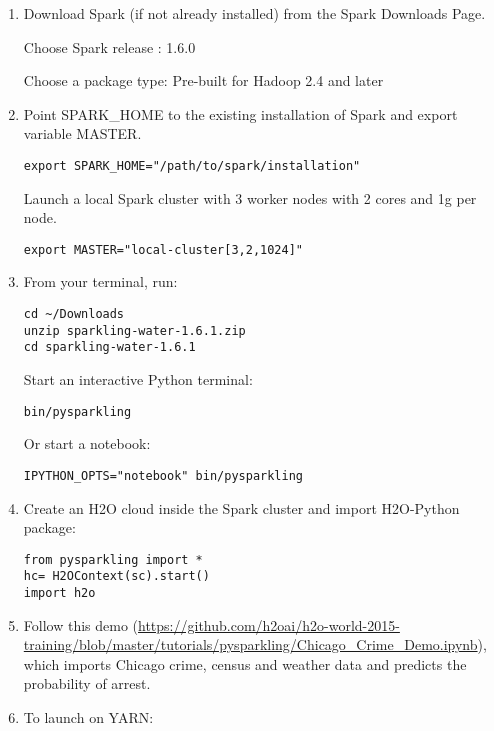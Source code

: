 \begin{enumerate}
\item Download Spark (if not already installed) from the Spark Downloads Page.

Choose Spark release : 1.6.0

Choose a package type: Pre-built for Hadoop 2.4 and later

\item Point SPARK\_HOME to the existing installation of Spark and export variable MASTER.

\begin{lstlisting}[style=Bash]
export SPARK_HOME="/path/to/spark/installation" 
\end{lstlisting}

Launch a local Spark cluster with 3 worker nodes with 2 cores and 1g per node.
\begin{lstlisting}[style=Bash]
export MASTER="local-cluster[3,2,1024]" 
\end{lstlisting}

\item From your terminal, run:

\begin{lstlisting}[style=Bash]
cd ~/Downloads
unzip sparkling-water-1.6.1.zip
cd sparkling-water-1.6.1
\end{lstlisting}

Start an interactive Python terminal:
\begin{lstlisting}[style=Bash]
bin/pysparkling
\end{lstlisting}

Or start a notebook:
\begin{lstlisting}[style=Bash]
IPYTHON_OPTS="notebook" bin/pysparkling
\end{lstlisting}

\item Create an H2O cloud inside the Spark cluster and import H2O-Python package:

\begin{lstlisting}[style=Scala]
from pysparkling import *
hc= H2OContext(sc).start()
import h2o
\end{lstlisting}

\item Follow this demo (\url{https://github.com/h2oai/h2o-world-2015-training/blob/master/tutorials/pysparkling/Chicago_Crime_Demo.ipynb}), which imports Chicago crime, census and weather data and predicts the probability of arrest.


\item To launch on YARN:


\end{enumerate}

